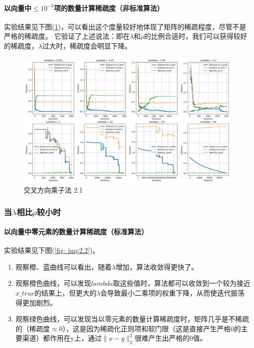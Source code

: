 \documentclass{article}
\begin{document}
\paragraph{以向量中$\leq 10^{-3}$项的数量计算稀疏度（非标准算法）\\}
实验结果见下图(\ref{fig: img2.1})，可以看出这个度量较好地体现了矩阵的稀疏程度，尽管不是严格的稀疏度。
它验证了上述说法：即在$\lambda$和$\rho$的比例合适时，我们可以获得较好的稀疏度，$\lambda$过大时，稀疏度会明显下降。
\begin{figure}[H]
    \centering
    \includegraphics[width=\linewidth]{./images/Figure_2_1.png}
    \caption{交叉方向乘子法 2.1}
    \label{fig: img2.1}
\end{figure}

\subsubsection{当$\lambda$相比$\rho$较小时}
\paragraph{以向量中零元素的数量计算稀疏度（标准算法）\\}
实验结果见下图(\ref{fig: img2.2})。\\
\begin{enumerate}
    \item 观察橙、蓝曲线可以看出，随着$\lambda$增加，算法收敛得更快了。
    \item 观察橙色曲线，可以发现$lambda$取这些值时，算法都可以收敛到一个较为接近$x\_true$的结果上，但更大的$\lambda$会导致最小二乘项的权重下降，从而使迭代振荡得更加剧烈。
    \item 观察绿色曲线，可以发现当以零元素的数量计算稀疏度时，矩阵几乎是不稀疏的（稀疏度$\approx0$），这是因为稀疏化正则项和软门限（这是直接产生严格0的主要渠道）都作用在y上，通过$\|x-y\|_2^2$很难产生出严格的0值。
\end{enumerate}
\newpage
\end{document}
